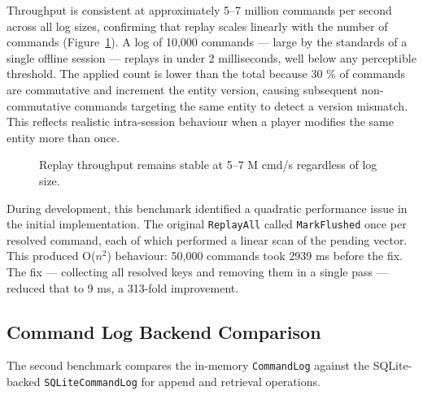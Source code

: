 \documentclass{article}
\begin{document}
Throughput is consistent at approximately 5–7 million commands per second across all log sizes, confirming that replay scales linearly with the number of commands (Figure~\ref{fig:throughput}). A log of 10,000 commands — large by the standards of a single offline session — replays in under 2 milliseconds, well below any perceptible threshold. The applied count is lower than the total because 30 \% of commands are commutative and increment the entity version, causing subsequent non-commutative commands targeting the same entity to detect a version mismatch. This reflects realistic intra-session behaviour when a player modifies the same entity more than once.

\begin{figure}[h]
\centering
{}
\caption{Replay throughput remains stable at 5–7 M cmd/s regardless of log size.}
\label{fig:throughput}
\end{figure}

During development, this benchmark identified a quadratic performance issue in the initial implementation. The original \texttt{ReplayAll} called \texttt{MarkFlushed} once per resolved command, each of which performed a linear scan of the pending vector. This produced O($n^2$) behaviour: 50,000 commands took 2939 ms before the fix. The fix — collecting all resolved keys and removing them in a single pass — reduced that to 9 ms, a 313-fold improvement.

\subsection{Command Log Backend Comparison}

The second benchmark compares the in-memory \texttt{CommandLog} against the SQLite-backed \texttt{SQLiteCommandLog} for append and retrieval operations.
\end{document}
